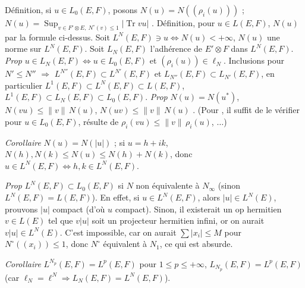 \documentclass[11pt,a4paper]{article}
\begin{document}
Définition, si $u \in L_0(E,F)$, posons $N(u) = N((\rho_i(u)))$ ; $N(u) = \operatorname{Sup}_{v \in F' \otimes E,\ N^{\circ}(v) \leq 1} |\operatorname{Tr} vu|$ . Définition, pour $u \in L(E,F)$, $N(u)$ par la formule ci-dessus. Soit  $L^N(E,F) \ni u \iff N(u) < +\infty$, $N(u)$ une norme sur $L^N(E,F)$.  Soit $L_N(E,F)$ l'adhérence de $E' \otimes F$ dans $L^N(E,F)$. \emph{Prop} $u \in L_N(E,F) \iff u \in L_0(E,F)$ et $(\rho_i(u)) \in \ell_N$. Inclusions pour $N' \leq N''$ $\Longrightarrow$ $L^{N''}(E,F) \subset L^{N'}(E,F)$ et $L_{N''}(E,F) \subset L_{N'}(E,F)$, en particulier $L^1(E,F) \subset L^N(E,F) \subset L(E,F)$, $L^1(E,F) \subset L_N(E,F) \subset L_0(E,F)$.  \emph{Prop} $N(u) = N(u^{*})$, $N(vu) \leq \|v\|\,N(u)$, $N(uv) \leq \|v\|\,N(u)$ .  (Pour  , il suffit de le vérifier pour $u \in L_0(E,F)$,  résulte de $\rho_i(vu) \leq \|v\|\,\rho_i(u)$, $\ldots$)

 

\emph{Corollaire} $N(u) = N(|u|)$ ; si $u = h + ik$, $N(h), N(k) \leq N(u) \leq N(h) + N(k)$, donc $u \in L^N(E,F) \iff h, k \in L^N(E,F)$.

\emph{Prop} $L^N(E,F) \subset L_0(E,F)$ si $N$ non équivalente à $N_\infty$ (sinon $L^N(E,F) = L(E,F)$). En effet, si $u \in L^N(E,F)$, \struck{\ill{}} alors $|u| \in L^N(E)$, prouvons $|u|$ compact (d'où $u$ compact). Sinon, il existerait un op hermitien $v \in L(E)$ tel que $v|u|$ soit un projecteur hermitien infini,
 or on aurait $v|u| \in L^N(E)$. C'est impossible, car on  aurait $\sum |x_i| \leq M$ pour $N^{\circ}((x_i)) \leq 1$, donc $N^{\circ}$ équivalent à $N_1$, ce qui est absurde. 

\emph{Corollaire} $L^{N_p}(E,F) = L^p(E,F)$ pour $1 \leq p \leq +\infty$,  $L_{N_p}(E,F) = L^p(E,F)$ (car $\ell_N = \ell^N \Longrightarrow L_N(E,F) = L^N(E,F)$).
\end{document}
